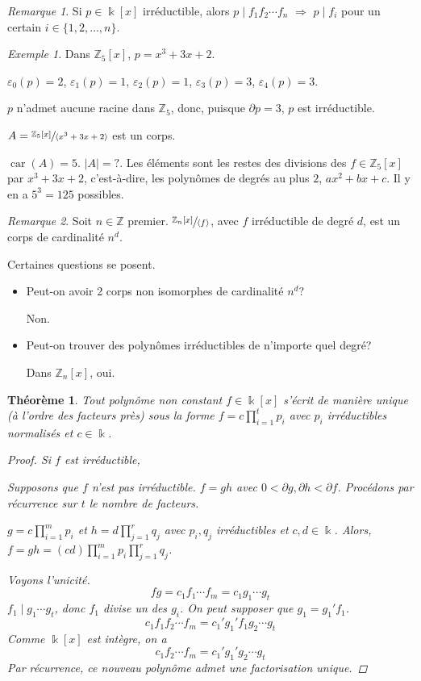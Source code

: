 \documentclass{report}
\newtheorem*{thm}{Th\'eor\`eme}
\theoremstyle{definition}
\theoremstyle{remark}
\newtheorem*{exem}{Exemple}
\newtheorem*{rmq}{Remarque}
\def\ZZ{\mathbb{Z}}
\newcommand*{\abs}[1]{\left|#1\right|}
\newcommand*{\caract}[1]{\operatorname{car}\left(#1\right)}
\begin{document}
	\begin{rmq}
		Si $p\in\Bbbk[x]$ irr\'eductible, alors $p\mid f_1f_2\cdots f_n$ $\Longrightarrow$ $p\mid f_i$ pour un certain $i\in\{1,2,\dots,n\}$.
	\end{rmq}

	\begin{exem}
		Dans $\ZZ_5[x]$, $p=x^3+3x+2$.

		$\varepsilon_0(p)=2$, $\varepsilon_1(p)=1$, $\varepsilon_2(p)=1$, $\varepsilon_3(p)=3$, $\varepsilon_4(p)=3$.

		$p$ n'admet aucune racine dans $\ZZ_5$, donc, puisque $\partial p=3$, $p$ est irr\'eductible.

		$A=\sfrac{\ZZ_5[x]}{\langle x^3+3x+2 \rangle}$ est un corps.

		$\caract{A}=5$. $\abs{A}=?$. Les \'el\'ements sont les restes des divisions des $f\in\ZZ_5[x]$ par $x^3+3x+2$, c'est-\`a-dire, les polyn\^omes de degr\'es au plus $2$, $ax^2+bx+c$. Il y en a $5^3=125$ possibles.
	\end{exem}

	\begin{rmq}
		Soit $n\in\ZZ$ premier. $\sfrac{\ZZ_n[x]}{\langle f \rangle}$, avec $f$ irr\'eductible de degr\'e $d$, est un corps de cardinalit\'e $n^d$.

		Certaines questions se posent.
		\begin{itemize}
			\item Peut-on avoir 2 corps non isomorphes de cardinalit\'e $n^d$?

			Non.
			\item Peut-on trouver des polyn\^omes irr\'eductibles de n'importe quel degr\'e?

			Dans $\ZZ_n[x]$, oui.
		\end{itemize}
	\end{rmq}

	\begin{thm}
		Tout polyn\^ome non constant $f\in\Bbbk[x]$ s'\'ecrit de mani\`ere unique (\`a l'ordre des facteurs pr\`es) sous la forme $f=c\prod_{i=1}^{t}p_i$ avec $p_i$ irr\'eductibles normalis\'es et $c\in\Bbbk$.
		\begin{proof}
			Si $f$ est irr\'eductible, \checkmark

			Supposons que $f$ n'est pas irr\'eductible. $f=gh$ avec $0<\partial g,\partial h<\partial f$. Proc\'edons par r\'ecurrence sur $t$ le nombre de facteurs.

			$g=c\prod_{i=1}^{m}p_i$ et $h=d\prod_{j=1}^{r}q_j$ avec $p_i,q_j$ irr\'eductibles et $c,d\in\Bbbk$. Alors, $f=gh=(cd)\prod_{i=1}^{m}p_i\prod_{j=1}^{r}q_j$.

			Voyons l'unicit\'e.
			\[ fg = c_1f_1\cdots f_m = c_1g_1\cdots g_t \]
			$f_1\mid g_1\cdots g_t$, donc $f_1$ divise un des $g_i$. On peut supposer que $g_1=g_1'f_1$.
			\[ c_1f_1f_2\cdots f_m = c_1'g_1'f_1g_2\cdots g_t \]
			Comme $\Bbbk[x]$ est int\`egre, on a
			\[ c_1f_2\cdots f_m = c_1'g_1'g_2\cdots g_t \]
			Par r\'ecurrence, ce nouveau polyn\^ome admet une factorisation unique.
		\end{proof}
	\end{thm}
\end{document}
